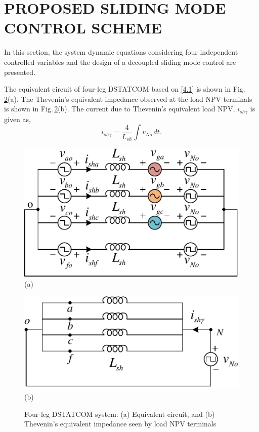 \section{PROPOSED SLIDING MODE CONTROL SCHEME}
\noindent In this section, the system dynamic equations considering four independent controlled variables and the design of a decoupled sliding mode control are presented.

The equivalent circuit of four-leg DSTATCOM based on \eqref{4.1} is shown in Fig.\,\ref{4.APF_equ}(a). The Thevenin's equivalent impedance observed at the load NPV terminals is shown in Fig.\,\ref{4.APF_equ}(b). The current due to Thevenin's equivalent load NPV, $i_{sh\gamma}$ is given as,  
\begin{equation} \label{4.4}
	i_{sh\gamma} = \frac{4}{L_{sh}} \int v_{No} \, dt.
\end{equation}
\begin{figure}[h!]
	\centering
	\includegraphics[scale=1]{figures/Chapter_4/Mine/APF_equ(a).pdf} \\
	\small (a) 
	\label{4.APF_equ(a)} 
\end{figure}
\begin{figure}[h!]  
	\centering
	\includegraphics[scale=1]{figures/Chapter_4/Mine/APF_equ(d).pdf} \\
	\small (b) 
	\label{4.APF_equ(b)}
	\caption{Four-leg DSTATCOM system: (a) Equivalent circuit, and (b) Thevenin's equivalent impedance seen by load NPV terminals} 
	\label{4.APF_equ}
\end{figure}  
